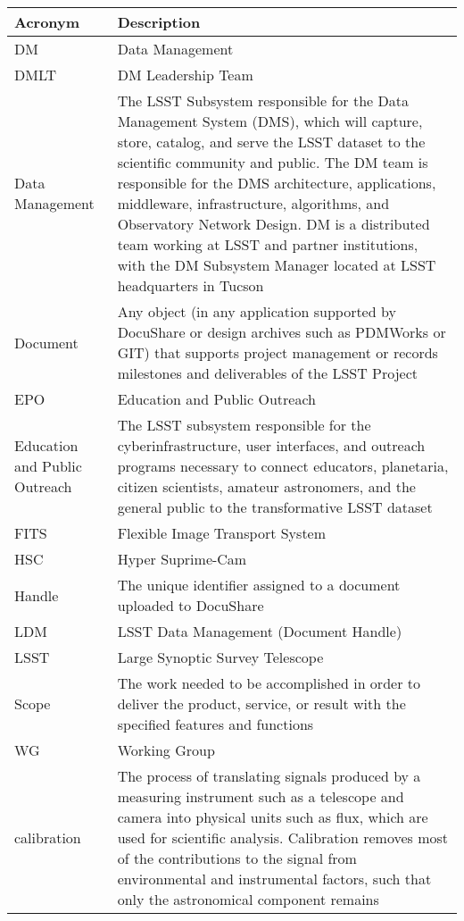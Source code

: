 \addtocounter{table}{-1}
\begin{longtable}{|p{}|p{}|}\hline
\textbf{Acronym} & \textbf{Description}  \\\hline

DM & \gls{Data Management} \\\hline
DMLT & \gls{DM} Leadership Team \\\hline
Data Management & The \gls{LSST} \gls{Subsystem} responsible for the \gls{Data Management} System (\gls{DMS}), which will capture, store, catalog, and serve the \gls{LSST} dataset to the scientific community and public. The DM team is responsible for the \gls{DMS} architecture, applications, middleware, infrastructure, algorithms, and Observatory Network Design. DM is a distributed team working at \gls{LSST} and partner institutions, with the DM \gls{Subsystem} Manager located at \gls{LSST} headquarters in Tucson \\\hline
Document & Any object (in any application supported by \gls{DocuShare} or design archives such as PDMWorks or GIT) that supports project management or records milestones and deliverables of the \gls{LSST} Project \\\hline
EPO & \gls{Education and Public Outreach} \\\hline
Education and Public Outreach & The \gls{LSST} subsystem responsible for the cyberinfrastructure, user interfaces, and outreach programs necessary to connect educators, planetaria, citizen scientists, amateur astronomers, and the general public to the transformative \gls{LSST} dataset \\\hline
FITS & \gls{Flexible Image Transport System} \\\hline
HSC & Hyper Suprime-Cam \\\hline
Handle & The unique identifier assigned to a document uploaded to \gls{DocuShare} \\\hline
LDM & \gls{LSST} \gls{Data Management} (\gls{Document} \gls{Handle}) \\\hline
LSST & Large Synoptic Survey Telescope \\\hline
Scope & The work needed to be accomplished in order to deliver the product, service, or result with the specified features and functions \\\hline
WG & Working Group \\\hline
calibration & The process of translating signals produced by a measuring instrument such as a telescope and \gls{camera} into physical units such as \gls{flux}, which are used for scientific analysis. Calibration removes most of the contributions to the signal from environmental and instrumental factors, such that only the astronomical component remains \\\hline

\end{longtable}
